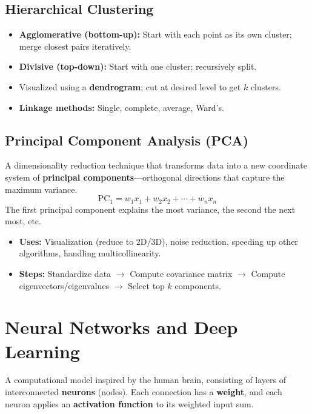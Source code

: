 \documentclass[11pt,a4paper]{article}
\begin{document}
\subsection{Hierarchical Clustering}
\begin{itemize}[leftmargin=*]
  \item \textbf{Agglomerative (bottom-up):} Start with each point as its own cluster; merge closest pairs iteratively.
  \item \textbf{Divisive (top-down):} Start with one cluster; recursively split.
  \item Visualized using a \textbf{dendrogram}; cut at desired level to get $k$ clusters.
  \item \textbf{Linkage methods:} Single, complete, average, Ward's.
\end{itemize}

\subsection{Principal Component Analysis (PCA)}

\begin{definitionbox}[PCA]
A dimensionality reduction technique that transforms data into a new coordinate system of \textbf{principal components}---orthogonal directions that capture the maximum variance.
$$\text{PC}_1 = w_1 x_1 + w_2 x_2 + \cdots + w_n x_n$$
The first principal component explains the most variance, the second the next most, etc.
\end{definitionbox}

\begin{itemize}[leftmargin=*]
  \item \textbf{Uses:} Visualization (reduce to 2D/3D), noise reduction, speeding up other algorithms, handling multicollinearity.
  \item \textbf{Steps:} Standardize data $\rightarrow$ Compute covariance matrix $\rightarrow$ Compute eigenvectors/eigenvalues $\rightarrow$ Select top $k$ components.
\end{itemize}

\section{Neural Networks and Deep Learning}

\begin{definitionbox}
A computational model inspired by the human brain, consisting of layers of interconnected \textbf{neurons} (nodes). Each connection has a \textbf{weight}, and each neuron applies an \textbf{activation function} to its weighted input sum.
\end{definitionbox}
\end{document}
